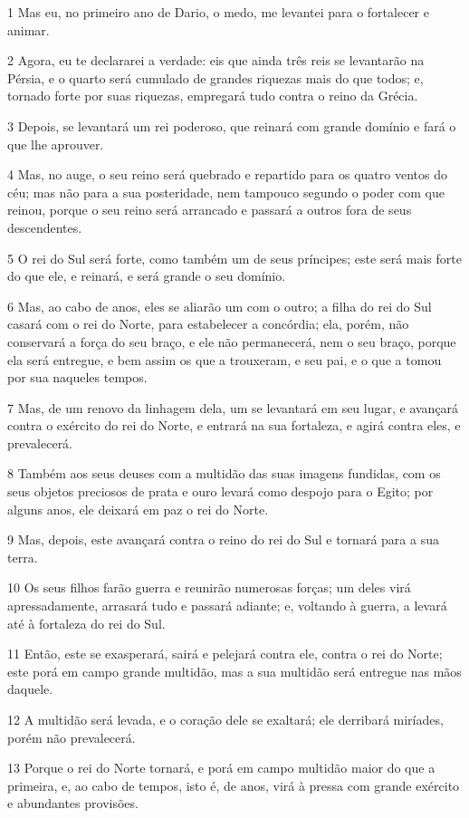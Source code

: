 \par 1 Mas eu, no primeiro ano de Dario, o medo, me levantei para o fortalecer e animar.
\par 2 Agora, eu te declararei a verdade: eis que ainda três reis se levantarão na Pérsia, e o quarto será cumulado de grandes riquezas mais do que todos; e, tornado forte por suas riquezas, empregará tudo contra o reino da Grécia.
\par 3 Depois, se levantará um rei poderoso, que reinará com grande domínio e fará o que lhe aprouver.
\par 4 Mas, no auge, o seu reino será quebrado e repartido para os quatro ventos do céu; mas não para a sua posteridade, nem tampouco segundo o poder com que reinou, porque o seu reino será arrancado e passará a outros fora de seus descendentes.
\par 5 O rei do Sul será forte, como também um de seus príncipes; este será mais forte do que ele, e reinará, e será grande o seu domínio.
\par 6 Mas, ao cabo de anos, eles se aliarão um com o outro; a filha do rei do Sul casará com o rei do Norte, para estabelecer a concórdia; ela, porém, não conservará a força do seu braço, e ele não permanecerá, nem o seu braço, porque ela será entregue, e bem assim os que a trouxeram, e seu pai, e o que a tomou por sua naqueles tempos.
\par 7 Mas, de um renovo da linhagem dela, um se levantará em seu lugar, e avançará contra o exército do rei do Norte, e entrará na sua fortaleza, e agirá contra eles, e prevalecerá.
\par 8 Também aos seus deuses com a multidão das suas imagens fundidas, com os seus objetos preciosos de prata e ouro levará como despojo para o Egito; por alguns anos, ele deixará em paz o rei do Norte.
\par 9 Mas, depois, este avançará contra o reino do rei do Sul e tornará para a sua terra.
\par 10 Os seus filhos farão guerra e reunirão numerosas forças; um deles virá apressadamente, arrasará tudo e passará adiante; e, voltando à guerra, a levará até à fortaleza do rei do Sul.
\par 11 Então, este se exasperará, sairá e pelejará contra ele, contra o rei do Norte; este porá em campo grande multidão, mas a sua multidão será entregue nas mãos daquele.
\par 12 A multidão será levada, e o coração dele se exaltará; ele derribará miríades, porém não prevalecerá.
\par 13 Porque o rei do Norte tornará, e porá em campo multidão maior do que a primeira, e, ao cabo de tempos, isto é, de anos, virá à pressa com grande exército e abundantes provisões.

